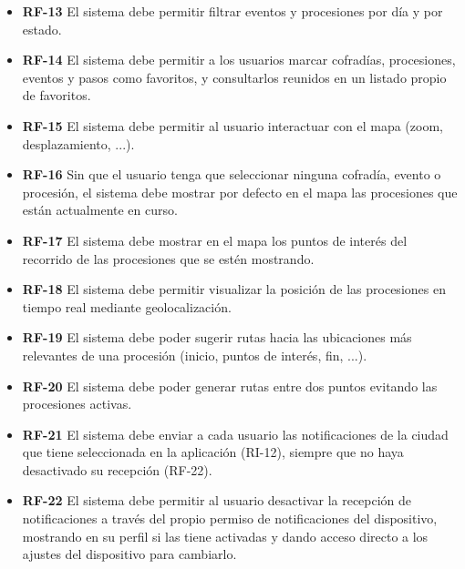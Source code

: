 \begin{itemize}
    \item \textbf{RF-13}  El sistema debe permitir filtrar eventos y procesiones por día y por estado.

    \item \textbf{RF-14}  El sistema debe permitir a los usuarios marcar cofradías, procesiones, eventos y pasos como favoritos, y consultarlos reunidos en un listado propio de favoritos.

    \item \textbf{RF-15}  El sistema debe permitir al usuario interactuar con el mapa (zoom, desplazamiento, ...).

    \item \textbf{RF-16}  Sin que el usuario tenga que seleccionar ninguna cofradía, evento o procesión, el sistema debe mostrar por defecto en el mapa las procesiones que están actualmente en curso.

    \item \textbf{RF-17}  El sistema debe mostrar en el mapa los puntos de interés del recorrido de las procesiones que se estén mostrando.

    \item \textbf{RF-18}  El sistema debe permitir visualizar la posición de las procesiones en tiempo real mediante geolocalización.

    \item \textbf{RF-19}  El sistema debe poder sugerir rutas hacia las ubicaciones más relevantes de una procesión (inicio, puntos de interés, fin, ...).

    \item \textbf{RF-20}  El sistema debe poder generar rutas entre dos puntos evitando las procesiones activas.

    \item \textbf{RF-21}  El sistema debe enviar a cada usuario las notificaciones de la ciudad que tiene seleccionada en la aplicación (RI-12), siempre que no haya desactivado su recepción (RF-22).

    \item \textbf{RF-22}  El sistema debe permitir al usuario desactivar la recepción de notificaciones a través del propio permiso de notificaciones del dispositivo, mostrando en su perfil si las tiene activadas y dando acceso directo a los ajustes del dispositivo para cambiarlo.

\end{itemize}

